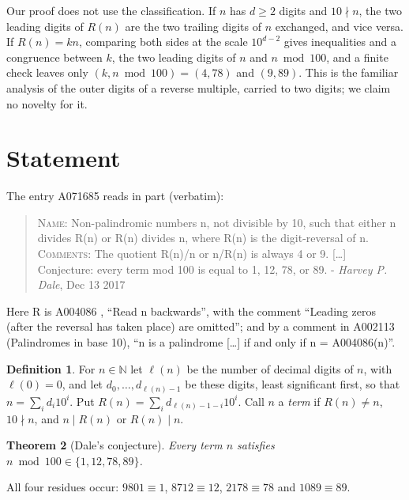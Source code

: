 \documentclass[11pt]{amsart}
\theoremstyle{plain}
\newtheorem{theorem}{Theorem}
\theoremstyle{definition}
\newtheorem{definition}[theorem]{Definition}
\newcommand{\N}{\mathbb{N}}
\newcommand{\len}{\ell}
\begin{document}
Our proof does not use the classification. If $n$ has $d\ge2$ digits and $10\nmid n$, the two leading digits of $R(n)$ are the two trailing digits of $n$ exchanged, and vice versa. If $R(n)=kn$, comparing both sides at the scale $10^{d-2}$ gives inequalities and a congruence between $k$, the two leading digits of $n$ and $n\bmod100$, and a finite check leaves only $(k,n\bmod100)=(4,78)$ and $(9,89)$. This is the familiar analysis of the outer digits of a reverse multiple, carried to two digits; we claim no novelty for it.

\section{Statement}\label{sec:statement}

The entry A071685 \cite{A071685} reads in part (verbatim):
\begin{quote}\raggedright
\textsc{Name}: Non-palindromic numbers n, not divisible by 10, such that either n divides R(n) or R(n) divides n, where R(n) is the digit-reversal of n.\\[2pt]
\textsc{Comments}: The quotient R(n)/n or n/R(n) is always 4 or 9. [\dots]\\
Conjecture: every term mod 100 is equal to 1, 12, 78, or 89. - \emph{Harvey P. Dale}, Dec 13 2017
\end{quote}
Here R is A004086 \cite{A004086}, ``Read n backwards'', with the comment ``Leading zeros (after the reversal has taken place) are omitted''; and by a comment in A002113 \cite{A002113} (Palindromes in base 10), ``n is a palindrome [\dots] if and only if n = A004086(n)''.

\begin{definition}\label{def:R}
For $n\in\N$ let $\len(n)$ be the number of decimal digits of $n$, with $\len(0)=0$, and let $d_0,\dots,d_{\len(n)-1}$ be these digits, least significant first, so that $n=\sum_i d_i10^i$. Put $R(n)=\sum_{i}d_{\len(n)-1-i}10^i$. Call $n$ a \emph{term} if $R(n)\ne n$, $10\nmid n$, and $n\mid R(n)$ or $R(n)\mid n$.
\end{definition}

\begin{theorem}[Dale's conjecture]\label{thm:main}
Every term $n$ satisfies $n\bmod100\in\{1,12,78,89\}$.
\end{theorem}

All four residues occur: $9801\equiv1$, $8712\equiv12$, $2178\equiv78$ and $1089\equiv89$.
\end{document}
